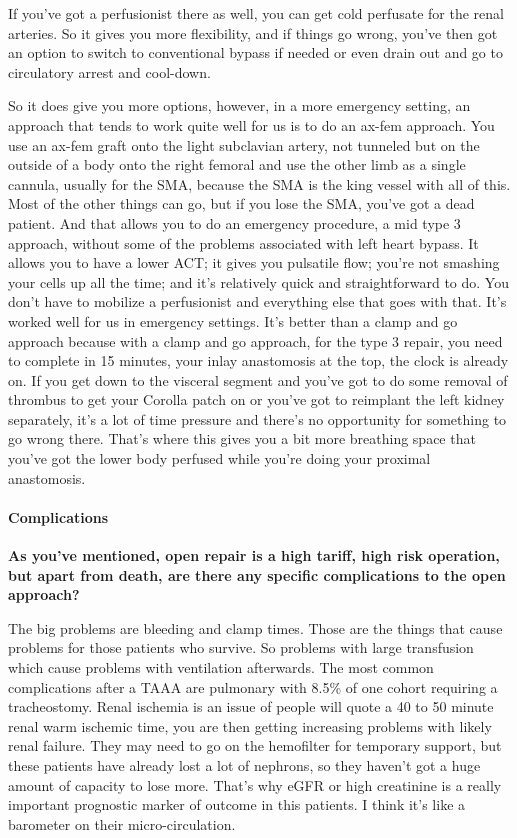 \documentclass[
]{book}
\begin{document}
If you've got a perfusionist there as well, you can get cold perfusate
for the renal arteries. So it gives you more flexibility, and if things
go wrong, you've then got an option to switch to conventional bypass if
needed or even drain out and go to circulatory arrest and cool-down.

So it does give you more options, however, in a more emergency setting,
an approach that tends to work quite well for us is to do an ax-fem
approach. You use an ax-fem graft onto the light subclavian artery, not
tunneled but on the outside of a body onto the right femoral and use the
other limb as a single cannula, usually for the SMA, because the SMA is
the king vessel with all of this. Most of the other things can go, but
if you lose the SMA, you've got a dead patient. And that allows you to
do an emergency procedure, a mid type 3 approach, without some of the
problems associated with left heart bypass. It allows you to have a
lower ACT; it gives you pulsatile flow; you're not smashing your cells
up all the time; and it's relatively quick and straightforward to do.
You don't have to mobilize a perfusionist and everything else that goes
with that. It's worked well for us in emergency settings. It's better
than a clamp and go approach because with a clamp and go approach, for
the type 3 repair, you need to complete in 15 minutes, your inlay
anastomosis at the top, the clock is already on. If you get down to the
visceral segment and you've got to do some removal of thrombus to get
your Corolla patch on or you've got to reimplant the left kidney
separately, it's a lot of time pressure and there's no opportunity for
something to go wrong there. That's where this gives you a bit more
breathing space that you've got the lower body perfused while you're
doing your proximal anastomosis.

\hypertarget{complications-2}{%
\paragraph{Complications}\label{complications-2}}

\textbf{As you've mentioned, open repair is a high tariff, high risk
operation, but apart from death, are there any specific complications to
the open approach?}

The big problems are bleeding and clamp times. Those are the things that
cause problems for those patients who survive. So problems with large
transfusion which cause problems with ventilation afterwards. The most
common complications after a TAAA are pulmonary with 8.5\% of one cohort
requiring a tracheostomy.\citep{coselli2016} Renal ischemia is an issue of
people will quote a 40 to 50 minute renal warm ischemic time, you are
then getting increasing problems with likely renal failure. They may
need to go on the hemofilter for temporary support, but these patients
have already lost a lot of nephrons, so they haven't got a huge amount
of capacity to lose more. That's why eGFR or high creatinine is a really
important prognostic marker of outcome in this patients. I think it's
like a barometer on their micro-circulation.
\end{document}
